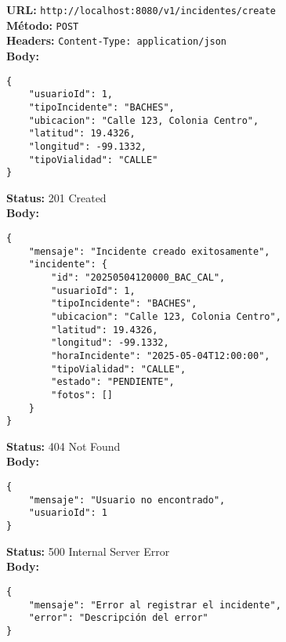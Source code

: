 \begin{tcolorbox}[request]
    \textbf{URL:} \textcolor{urlColor}{\texttt{http://localhost:8080/v1/incidentes/create}}\\
    \textbf{Método:} \textcolor{methodColor}{\texttt{POST}}\\
    \textbf{Headers:} \textcolor{headerColor}{\texttt{Content-Type: application/json}}\\
    \textbf{Body:}
    \begin{verbatim}
{
    "usuarioId": 1,
    "tipoIncidente": "BACHES",
    "ubicacion": "Calle 123, Colonia Centro",
    "latitud": 19.4326,
    "longitud": -99.1332,
    "tipoVialidad": "CALLE"
}
    \end{verbatim}
\end{tcolorbox}

\begin{tcolorbox}[response]
    \textbf{Status:} 201 Created\\
    \textbf{Body:}
    \begin{verbatim}
{
    "mensaje": "Incidente creado exitosamente",
    "incidente": {
        "id": "20250504120000_BAC_CAL",
        "usuarioId": 1,
        "tipoIncidente": "BACHES",
        "ubicacion": "Calle 123, Colonia Centro",
        "latitud": 19.4326,
        "longitud": -99.1332,
        "horaIncidente": "2025-05-04T12:00:00",
        "tipoVialidad": "CALLE",
        "estado": "PENDIENTE",
        "fotos": []
    }
}
    \end{verbatim}
\end{tcolorbox}

\begin{tcolorbox}[response]
    \textbf{Status:} 404 Not Found\\
    \textbf{Body:}
    \begin{verbatim}
{
    "mensaje": "Usuario no encontrado",
    "usuarioId": 1
}
    \end{verbatim}
\end{tcolorbox}

\begin{tcolorbox}[response]
    \textbf{Status:} 500 Internal Server Error\\
    \textbf{Body:}
    \begin{verbatim}
{
    "mensaje": "Error al registrar el incidente",
    "error": "Descripción del error"
}
    \end{verbatim}
\end{tcolorbox}

